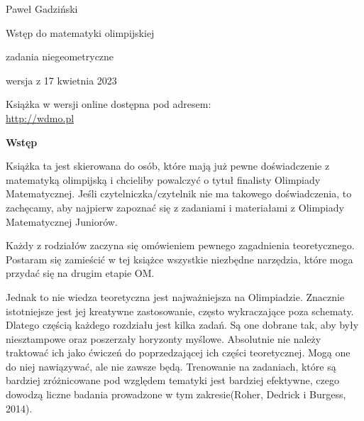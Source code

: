 \thispagestyle{empty}\addtocounter{page}{-1}
	\begin{center}
		\fontsize{15}{15}\selectfont
		Paweł Gadziński

		\vspace{50px}

		\fontsize{40}{40}\selectfont
		\textcolor{kolor}{Wstęp do matematyki olimpijskiej}

		\vspace{20px}

		\fontsize{25}{25}\selectfont
		\textcolor{kolor}{zadania niegeometryczne}

		\vspace{40px}

		\fontsize{15}{15}\selectfont
		wersja z 17 kwietnia 2023
	\end{center}
\vspace*{\fill}
\begin{center}
		\fontsize{15}{15}\selectfont
		Książka w wersji online dostępna pod adresem: \\
		\url{http://wdmo.pl}
\end{center}
\newpage
	\vspace*{\fill}
	\begin{center}
		\fontsize{20}{20}\selectfont
		\textbf{Wstęp}
		\vspace{30px}
	\end{center}
		\noindent
		Książka ta jest skierowana do osób, które mają już pewne doświadczenie z matematyką olimpijską i chcieliby powalczyć o tytuł finalisty Olimpiady Matematycznej. Jeśli czytelniczka/czytelnik nie ma takowego doświadczenia, to zachęcamy, aby najpierw zapoznać się z zadaniami i materiałami z Olimpiady Matematycznej Juniorów.

		\vspace{10px}
		\noindent
		Każdy z rodziałów zaczyna się omówieniem pewnego zagadnienia teoretycznego. Postaram się zamieścić w tej książce wszystkie niezbędne narzędzia, które moga przydać się na drugim etapie OM. 

		\vspace{10px}
		\noindent
		Jednak to nie wiedza teoretyczna jest najważniejsza na Olimpiadzie. Znacznie istotniejsze jest jej kreatywne zastosowanie, często wykraczające poza schematy. Dlatego częścią każdego rozdziału jest kilka zadań. Są one dobrane tak, aby były niesztampowe oraz poszerzały horyzonty myślowe. Absolutnie nie należy traktować ich jako ćwiczeń do poprzedzającej ich części teoretycznej. Mogą one do niej nawiązywać, ale nie zawsze będą. Trenowanie na zadaniach, które są bardziej zróżnicowane pod względem tematyki jest bardziej efektywne, czego dowodzą liczne badania prowadzone w tym zakresie(Roher, Dedrick i Burgess, 2014). 

